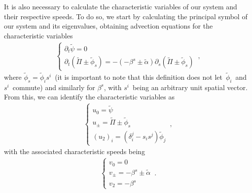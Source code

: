 It is also necessary to calculate the characteristic variables of our system and their respective speeds. To do so, we start by calculating the principal symbol of our system and its eigenvalues, obtaining advection equations for the characteristic variables
%
\begin{align}
    \begin{cases}
        \partial_t \tilde{\psi} = 0 \\
        \partial_t (\tilde{\Pi} \pm \tilde{\phi}_s) = - (-\beta^s \pm \tilde{\alpha}) \partial_s (\tilde{\Pi} \pm \tilde{\phi}_s)
    \end{cases}\,,
\end{align}
%
where $\tilde{\phi}_s = \tilde{\phi}_i s^i$~(it is important to note that this definition does not let~$\tilde{\phi}_i$~and~$s^i$~commute) and similarly for $\beta^s$, with $s^i$~being an arbitrary unit spatial vector. From this, we can identify the characteristic variables as 
%
\begin{align}
    \begin{cases}
        u_0 = \tilde{\psi} \\
        u_\pm = \tilde{\Pi} \pm \tilde{\phi}_s \\
        (u_2)_i = (\delta_i^j - s_i s^j) \tilde{\phi}_j
    \end{cases}\,,
\end{align}
%
with the associated characteristic speeds being
%
\begin{align}
    \begin{cases}
        v_0 = 0 \\
        v_\pm = -\beta^s \pm \tilde{\alpha} \\
        v_2 = -\beta^s
    \end{cases}\,.
\end{align}

